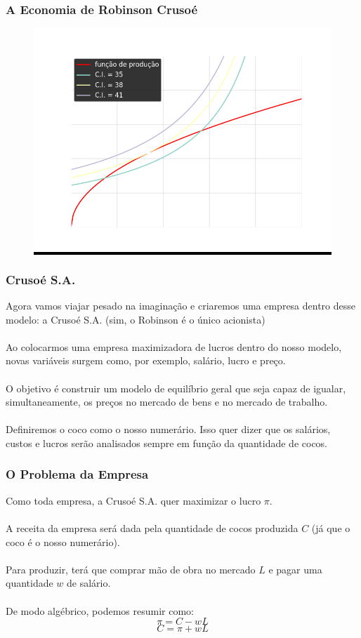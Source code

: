 \documentclass{beamer}[10]
\begin{document}
\begin{frame}
	\frametitle{A Economia de Robinson Crusoé}

	\begin{figure}[H]
		\centering
		\colorbox{black}{\includegraphics[scale=0.6]{cap33_1-economia_robinson.png}}
	\end{figure}

\end{frame}

\begin{frame}
	\frametitle{Crusoé S.A.}

	Agora vamos viajar pesado na imaginação e criaremos uma empresa dentro desse modelo: a Crusoé S.A. (sim, o Robinson é o único acionista)
	\\~\\
	Ao colocarmos uma empresa maximizadora de lucros dentro do nosso modelo, novas variáveis surgem como, por exemplo, salário, lucro e preço.
	\\~\\
	O objetivo é construir um modelo de equilíbrio geral que seja capaz de igualar, simultaneamente, os preços no mercado de bens e no mercado de trabalho.
	\\~\\
	Definiremos o coco como o nosso numerário. Isso quer dizer que os salários, custos e lucros serão analisados sempre em função da quantidade de cocos. 

\end{frame}

\begin{frame}
	\frametitle{O Problema da Empresa}

	Como toda empresa, a Crusoé S.A. quer maximizar o lucro $\pi$.
	\\~\\
	A receita da empresa será dada pela quantidade de cocos produzida $C$ (já que o coco é o nosso numerário).
	\\~\\
	Para produzir, terá que comprar mão de obra no mercado $L$ e pagar uma quantidade $w$ de salário.
	\\~\\
	De modo algébrico, podemos resumir como:
	$$ \pi = C - wL $$
	$$ C = \pi + wL $$

\end{frame}
\end{document}
